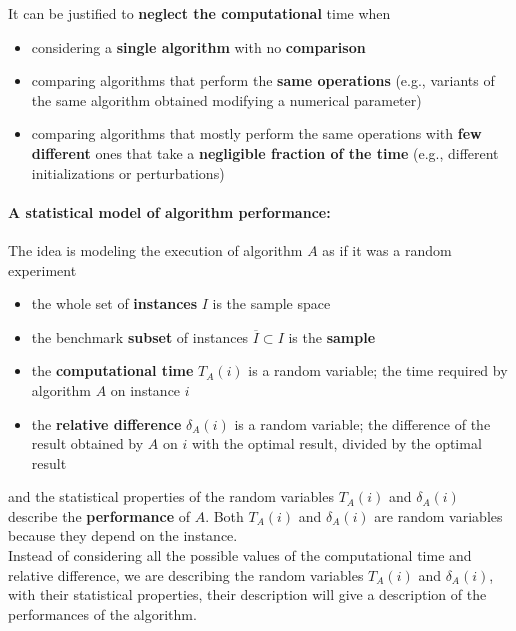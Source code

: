 It can be justified to \textbf{neglect the computational} time when
\begin{itemize}
	\item considering a \textbf{single algorithm} with no \textbf{comparison} 
	\item comparing algorithms that perform the \textbf{same operations} (e.g., variants of the same algorithm obtained modifying a numerical parameter)
	\item comparing algorithms that mostly perform the same operations with \textbf{few different} ones that take a \textbf{negligible fraction of the time} (e.g., different initializations or perturbations)
\end{itemize}

\paragraph{A statistical model of algorithm performance:} The idea is modeling the execution of algorithm $A$ as if it was a random experiment
\begin{itemize}
	\item the whole set of \textbf{instances} $I$ is the sample space
	\item the benchmark \textbf{subset} of instances $\overline{I} \subset I$ is the \textbf{sample}
	\item the \textbf{computational time} $T_A (i)$ is a random variable; the time required by algorithm $A$ on instance $i$
	\item the \textbf{relative difference} $\delta_A (i )$ is a random variable; the difference of the result obtained by $A$ on $i$ with the optimal result, divided by the optimal result
\end{itemize}
and the statistical properties of the random variables $T_A (i )$ and $\delta_A (i )$ describe the \textbf{performance} of $A$. Both $T_A (i)$ and $\delta_A (i)$ are random variables because they depend on the instance. \\

Instead of considering all the possible values of the computational time and relative difference, we are describing the random variables $T_A (i)$ and $\delta_A (i)$, with their statistical properties, their description will give a description of the performances of the algorithm.\\

\newpage

